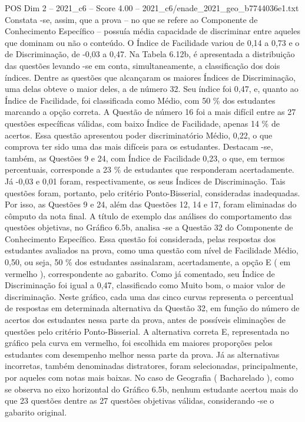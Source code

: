 \begin{textsample}{POS Dim 2 – 2021\_c6 – Score 4.00 – 2021\_c6/enade\_2021\_geo\_b7744036e1.txt}
Constata -se, assim, que a prova – no que se refere ao Componente de Conhecimento Específico – possuía média capacidade de discriminar entre aqueles que dominam ou não o conteúdo.
O Índice de Facilidade variou de 0,14 a 0,73 e o de Discriminação, de -0,03 a 0,47.
Na Tabela 6.12b, é apresentada a distribuição das questões levando -se em conta, simultaneamente, a classificação dos dois índices.
Dentre as questões que alcançaram os maiores Índices de Discriminação, uma delas obteve o maior deles, a de número 32.
Seu índice foi 0,47, e, quanto ao Índice de Facilidade, foi classificada como Médio, com 50 \% dos estudantes marcando a opção correta.
A Questão de número 16 foi a mais difícil entre as 27 questões específicas válidas, com baixo Índice de Facilidade, apenas 14 \% de acertos.
Essa questão apresentou poder discriminatório Médio, 0,22, o que comprova ter sido uma das mais difíceis para os estudantes.
Destacam -se, também, as Questões 9 e 24, com Índice de Facilidade 0,23, o que, em termos percentuais, corresponde a 23 \% de estudantes que responderam acertadamente.
Já -0,03 e 0,01 foram, respectivamente, os seus Índices de Discriminação.
Tais questões foram, portanto, pelo critério Ponto-Bisserial, consideradas inadequadas.
Por isso, as Questões 9 e 24, além das Questões 12, 14 e 17, foram eliminadas do cômputo da nota final.
A título de exemplo das análises do comportamento das questões objetivas, no Gráfico 6.5b, analisa -se a Questão 32 do Componente de Conhecimento Específico.
Essa questão foi considerada, pelas respostas dos estudantes avaliados na prova, como uma questão com nível de Facilidade Médio, 0,50, ou seja, 50 \% dos estudantes assinalaram, acertadamente, a opção E ( em vermelho ), correspondente ao gabarito.
Como já comentado, seu Índice de Discriminação foi igual a 0,47, classificado como Muito bom, o maior valor de discriminação.
Neste gráfico, cada uma das cinco curvas representa o percentual de respostas em determinada alternativa da Questão 32, em função do número de acertos dos estudantes nessa parte da prova, antes de possíveis eliminações de questões pelo critério Ponto-Bisserial.
A alternativa correta E, representada no gráfico pela curva em vermelho, foi escolhida em maiores proporções pelos estudantes com desempenho melhor nessa parte da prova.
Já as alternativas incorretas, também denominadas distratores, foram selecionadas, principalmente, por aqueles com notas mais baixas.
No caso de Geografia ( Bacharelado ), como se observa no eixo horizontal do Gráfico 6.5b, nenhum estudante acertou mais do que 23 questões dentre as 27 questões objetivas válidas, considerando -se o gabarito original.

\end{textsample}
